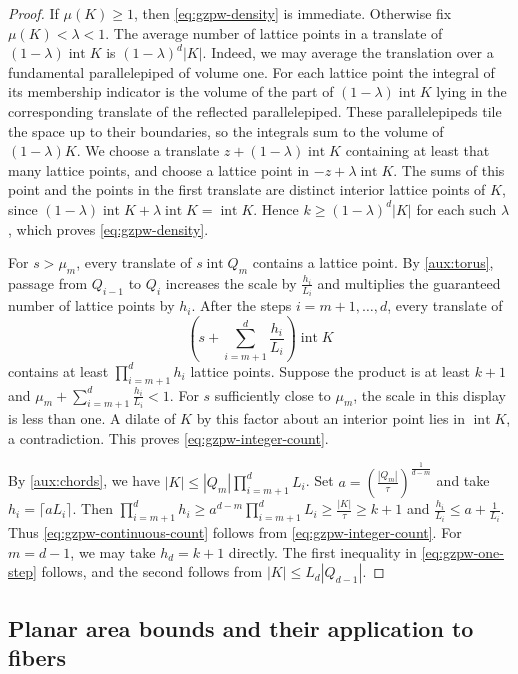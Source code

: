 \documentclass[reqno, 11pt]{article}
\numberwithin{equation}{section}
\theoremstyle{definition}
\DeclareMathOperator{\intr}{int}
\begin{document}
\begin{proof}
If $\mu(K)\ge1$, then \eqref{eq:gzpw-density} is immediate.
Otherwise fix $\mu(K)<\lambda<1$. The average number of lattice points in a
translate of $(1-\lambda)\intr K$ is $(1-\lambda)^d|K|$. Indeed,
we may average the translation over a fundamental parallelepiped of
volume one. For each lattice point the integral of its membership
indicator is the volume of the part of $(1-\lambda)\intr K$ lying in
the corresponding translate of the reflected parallelepiped. These
parallelepipeds tile the space up to their boundaries, so the integrals
sum to the volume of $(1-\lambda)K$. We choose
a translate $z+(1-\lambda)\intr K$ containing at least that many
lattice points, and choose a lattice point in $-z+\lambda\intr K$.
The sums of this point and the points in the first translate are
distinct interior lattice points of $K$, since
$(1-\lambda)\intr K+\lambda\intr K=\intr K$. Hence
$k\ge(1-\lambda)^d|K|$ for each such $\lambda$, which proves
\eqref{eq:gzpw-density}.

For $s>\mu_m$, every translate of $s\intr Q_m$ contains a lattice
point. By \cref{aux:torus}, passage from $Q_{i-1}$ to $Q_i$
increases the scale by $\frac{h_i}{L_i}$ and multiplies the
guaranteed number of lattice points by $h_i$. After the steps $i=m+1,\ldots,d$, every translate of
\[
               \left(s+\sum_{i=m+1}^d \frac{h_i}{L_i}\right)\intr K
\]
contains at least $\prod_{i=m+1}^d h_i$ lattice points. Suppose
the product is at least $k+1$ and
$\mu_m+\sum_{i=m+1}^{d}\frac{h_i}{L_i}<1$.
For $s$ sufficiently close to $\mu_m$, the scale in this display is
less than one. A dilate of $K$ by this factor about an interior point
lies in $\intr K$, a contradiction. This proves
\eqref{eq:gzpw-integer-count}.

By \cref{aux:chords}, we have $|K|\le |Q_m|\prod_{i=m+1}^d L_i$.
Set $a=(\frac{|Q_m|}{\tau})^{\frac{1}{d-m}}$ and take $h_i=\lceil aL_i\rceil$.
Then $\prod_{i=m+1}^d h_i\ge a^{d-m}\prod_{i=m+1}^d L_i
\ge \frac{|K|}{\tau}\ge k+1$ and $\frac{h_i}{L_i}\le a+\frac{1}{L_i}$. Thus \eqref{eq:gzpw-continuous-count} follows from
\eqref{eq:gzpw-integer-count}. For $m=d-1$, we may take
$h_d=k+1$ directly. The first inequality in \eqref{eq:gzpw-one-step}
follows, and the second follows from $|K|\le L_d|Q_{d-1}|$.
\end{proof}

\subsection{Planar area bounds and their application to fibers}
\end{document}
